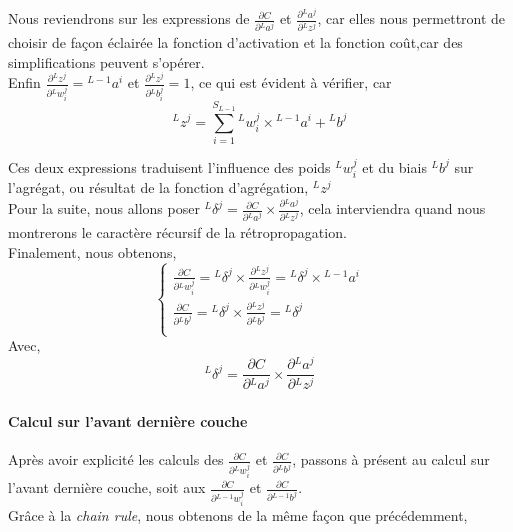 \documentclass[10pt,a4paper]{report}
\newcommand{\lexp}[1]{\phantom{}^{#1}}
\newcommand{\elem}[4]{\lexp{#2}#1^{#3}_{#4}}
\begin{document}
				Nous reviendrons sur les expressions de $\frac{\partial C}{\partial \elem{a}{L}{j}{}}$ et $\frac{\partial \elem{a}{L}{j}{}}{\partial \elem{z}{L}{j}{}}$, car elles nous permettront de choisir de façon éclairée la fonction d'activation et la fonction coût,car des simplifications peuvent s'opérer.\\
				
				Enfin $\frac{\partial \elem{z}{L}{j}{}}{\partial \elem{w}{L}{j}{i}}=\elem{a}{L-1}{i}{}$ et $\frac{\partial \elem{z}{L}{j}{}}{\partial \elem{b}{L}{j}{i}} = 1$, ce qui est évident à vérifier, car 
				$$\elem{z}{L}{j}{} = \sum_{i=1}^{S_{L-1}}{\elem{w}{L}{j}{i} \times \elem{a}{L-1}{i}{}} + \elem{b}{L}{j}{}$$
				
				Ces deux expressions traduisent l'influence des poids $\elem{w}{L}{j}{i}$ et du biais $\elem{b}{L}{j}{}$ sur l'agrégat, ou résultat de la fonction d'agrégation, $\elem{z}{L}{j}{}$\\
				
				Pour la suite, nous allons poser $\elem{\delta}{L}{j}{} = \frac{\partial C}{\partial \elem{a}{L}{j}{}} \times \frac{\partial \elem{a}{L}{j}{}}{\partial \elem{z}{L}{j}{}}$, cela interviendra quand nous montrerons le caractère récursif de la rétropropagation.\\
				
				Finalement, nous obtenons,
				$$\left\{
				\begin{array}{l}
					\frac{\partial C}{\partial \elem{w}{L}{j}{i}} = \elem{\delta}{L}{j}{} \times \frac{\partial \elem{z}{L}{j}{}}{\partial \elem{w}{L}{j}{i}} = \elem{\delta}{L}{j}{} \times \elem{a}{L-1}{i}{} \\
					
					\frac{\partial C}{\partial \elem{b}{L}{j}{}} = \elem{\delta}{L}{j}{} \times \frac{\partial \elem{z}{L}{j}{}}{\partial \elem{b}{L}{j}{}} = \elem{\delta}{L}{j}{}\\
				\end{array}
				\right.$$
				Avec,
				$$\elem{\delta}{L}{j}{} = \frac{\partial C}{\partial \elem{a}{L}{j}{}} \times \frac{\partial \elem{a}{L}{j}{}}{\partial \elem{z}{L}{j}{}}$$
				
				\paragraph{Calcul sur l'avant dernière couche}
				
				Après avoir explicité les calculs des $\frac{\partial C}{\partial \elem{w}{L}{j}{i}}$ et $\frac{\partial C}{\partial \elem{b}{L}{j}{}}$, passons à présent au calcul sur l'avant dernière couche, soit aux $\frac{\partial C}{\partial \elem{w}{L-1}{j}{i}}$ et $\frac{\partial C}{\partial \elem{b}{L-1}{j}{}}$.\\
				Grâce à la \emph{chain rule}, nous obtenons de la même façon que précédemment,
				
\end{document}
